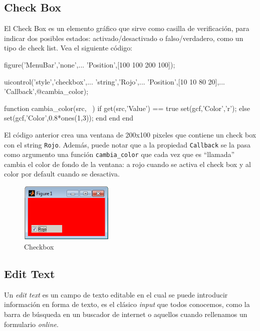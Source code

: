 \subsection{Check Box}\label{check-box}

El Check Box es un elemento gráfico que sirve como casilla de
verificación, para indicar dos posibles estados: activado/desactivado o
falso/verdadero, como un tipo de check list. Vea el siguiente código:


\begin{matlab}
figure('MenuBar','none',...
    'Position',[100 100 200 100]);

uicontrol('style','checkbox',...
    'string','Rojo',...
    'Position',[10 10 80 20],...
    'Callback',@cambia_color);

    function cambia_color(src, ~)
        if get(src,'Value') == true
            set(gcf,'Color','r');
        else
            set(gcf,'Color',0.8*ones(1,3));
        end
    end
end
\end{matlab}

El código anterior crea una ventana de 200x100 pixeles que contiene un
check box con el string \texttt{Rojo}. Además, puede notar que a la
propiedad \texttt{Callback} se la pasa como argumento una función
\verb|cambia_color| que cada vez que es ``llamada'' cambia el color
de fondo de la ventana: a rojo cuando se activa el check box y al color
por default cuando se desactiva.

\begin{figure}[htbp]
\centering
\includegraphics[width=0.4\textwidth]{images/ch8/checkbox_example.png}
\caption{Checkbox}
\end{figure}

\subsection{Edit Text}\label{edit-text}

Un \emph{edit text} es un campo de texto editable en el cual se puede
introducir información en forma de texto, es el clásico \emph{input} que
todos conocemos, como la barra de búsqueda en un buscador de internet o
aquellos cuando rellenamos un formulario \emph{online}.

